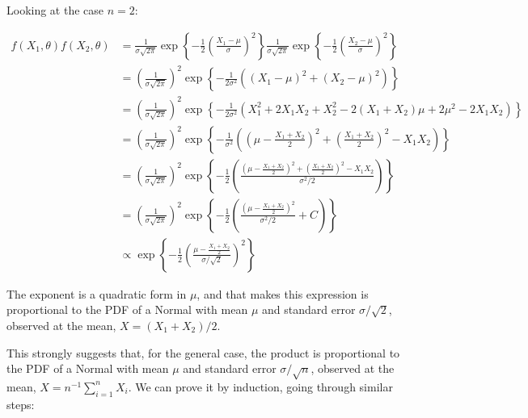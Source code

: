 Looking at the case \(n = 2\):

\begin{align*} 
f(X_{1}, \theta) f(X_{2}, \theta) &= 
\frac{1}{\sigma \sqrt{2 \pi}} \exp \left\{-\frac{1}{2} \left(\frac{X_{1} - \mu}{\sigma} \right)^{2} \right\}
\frac{1}{\sigma \sqrt{2 \pi}} \exp \left\{-\frac{1}{2} \left(\frac{X_{2} - \mu}{\sigma} \right)^{2} \right\} \\
&= \left( \frac{1}{\sigma \sqrt{2 \pi}} \right)^{2} \exp \left\{-\frac{1}{2\sigma^{2}} \left((X_{1} - \mu)^{2} + (X_{2} - \mu)^{2} \right) \right\} \\
&= \left( \frac{1}{\sigma \sqrt{2 \pi}} \right)^{2} \exp \left\{-\frac{1}{2\sigma^{2}} \left(
X_{1}^{2} + 2 X_{1} X_{2} + X_{2}^{2} - 2 (X_{1} + X_{2})\mu + 2\mu^{2} - 2 X_{1} X_{2}
\right) \right\} \\
&= \left( \frac{1}{\sigma \sqrt{2 \pi}} \right)^{2} \exp \left\{-\frac{1}{\sigma^{2}}\left(
\left(\mu - \frac{X_{1} + X_{2}}{2}\right)^{2} + \left(\frac{X_{1} + X_{2}}{2}\right)^{2} - X_{1} X_{2}
\right) \right\} \\
&= \left( \frac{1}{\sigma \sqrt{2 \pi}} \right)^{2} \exp \left\{-\frac{1}{2} \left(
\frac{\left(\mu - \frac{X_{1} + X_{2}}{2}\right)^{2} + \left(\frac{X_{1} + X_{2}}{2}\right)^{2} - X_{1} X_{2}}{\sigma^{2} / 2}
\right) \right\} \\
&= \left( \frac{1}{\sigma \sqrt{2 \pi}} \right)^{2} \exp \left\{-\frac{1}{2} \left(
\frac{\left(\mu - \frac{X_{1} + X_{2}}{2}\right)^{2}}{\sigma^{2} / 2} + C
\right) \right\} \\
&\propto \exp \left\{-\frac{1}{2}
\left(\frac{\mu - \frac{X_{1} + X_{2}}{2}}{\sigma / \sqrt{2}}\right)^{2}
\right\}
\end{align*}

The exponent is a quadratic form in \(\mu\), and that makes this
expression is proportional to the PDF of a Normal with mean \(\mu\) and
standard error \(\sigma / \sqrt{2}\), observed at the mean,
\(X = (X_{1} + X_{2})/2\).

This strongly suggests that, for the general case, the product is
proportional to the PDF of a Normal with mean \(\mu\) and standard error
\(\sigma / \sqrt{n}\), observed at the mean,
\(X = n^{-1} \sum_{i=1}^{n} X_{i}\). We can prove it by induction, going
through similar steps:

